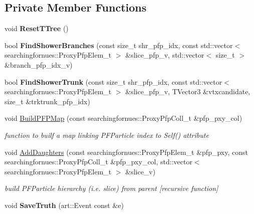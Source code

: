 \subsection*{Private Member Functions}
\begin{DoxyCompactItemize}
\item 
\hypertarget{classShowerMerger_a4529aa1606f5db0884cbbf23945ec98a}{void {\bfseries Reset\-T\-Tree} ()}\label{classShowerMerger_a4529aa1606f5db0884cbbf23945ec98a}

\item 
\hypertarget{classShowerMerger_a6fb74d3738dbaf29ebe0257eea8e3c6c}{bool {\bfseries Find\-Shower\-Branches} (const size\-\_\-t shr\-\_\-pfp\-\_\-idx, const std\-::vector$<$ searchingfornues\-::\-Proxy\-Pfp\-Elem\-\_\-t $>$ \&slice\-\_\-pfp\-\_\-v, std\-::vector$<$ size\-\_\-t $>$ \&branch\-\_\-pfp\-\_\-idx\-\_\-v)}\label{classShowerMerger_a6fb74d3738dbaf29ebe0257eea8e3c6c}

\item 
\hypertarget{classShowerMerger_a559f4ef0334813f609ce0038fc5b273c}{bool {\bfseries Find\-Shower\-Trunk} (const size\-\_\-t shr\-\_\-pfp\-\_\-idx, const std\-::vector$<$ searchingfornues\-::\-Proxy\-Pfp\-Elem\-\_\-t $>$ \&slice\-\_\-pfp\-\_\-v, T\-Vector3 \&vtxcandidate, size\-\_\-t \&trktrunk\-\_\-pfp\-\_\-idx)}\label{classShowerMerger_a559f4ef0334813f609ce0038fc5b273c}

\item 
void \hyperlink{classShowerMerger_a9fb233f4aafc287d68e3f80bc5fcf27a}{Build\-P\-F\-P\-Map} (const searchingfornues\-::\-Proxy\-Pfp\-Coll\-\_\-t \&pfp\-\_\-pxy\-\_\-col)
\begin{DoxyCompactList}\small\item\em function to builf a map linking P\-F\-Particle index to Self() attribute \end{DoxyCompactList}\item 
void \hyperlink{classShowerMerger_af7fd315853bd22adcb9a9479706673de}{Add\-Daughters} (const searchingfornues\-::\-Proxy\-Pfp\-Elem\-\_\-t \&pfp\-\_\-pxy, const searchingfornues\-::\-Proxy\-Pfp\-Coll\-\_\-t \&pfp\-\_\-pxy\-\_\-col, std\-::vector$<$ searchingfornues\-::\-Proxy\-Pfp\-Elem\-\_\-t $>$ \&slice\-\_\-v)
\begin{DoxyCompactList}\small\item\em build P\-F\-Particle hierarchy (i.\-e. slice) from parent \mbox{[}recursive function\mbox{]} \end{DoxyCompactList}\item 
\hypertarget{classShowerMerger_a2182bc1472f67f60cd02c7546fb0eabd}{void {\bfseries Save\-Truth} (art\-::\-Event const \&e)}\label{classShowerMerger_a2182bc1472f67f60cd02c7546fb0eabd}

\end{DoxyCompactItemize}
